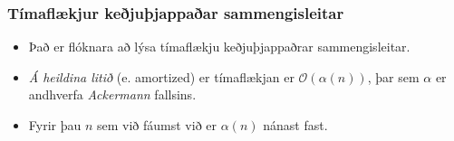 \documentclass{beamer}
\begin{document}
\begin{frame}
\frametitle{Tímaflækjur keðjuþjappaðar sammengisleitar}
\begin{itemize}
	\item<1-> Það er flóknara að lýsa tímaflækju keðjuþjappaðrar sammengisleitar.
	\item<2-> \emph{Á heildina litið} (e. amortized) er tímaflækjan er $\mathcal{O}(\alpha(n))$, þar sem $\alpha$ er andhverfa \emph{Ackermann} fallsins.
	\item<3-> Fyrir þau $n$ sem við fáumst við er $\alpha(n)$ nánast fast.
\end{itemize}
\end{frame}
\end{document}
